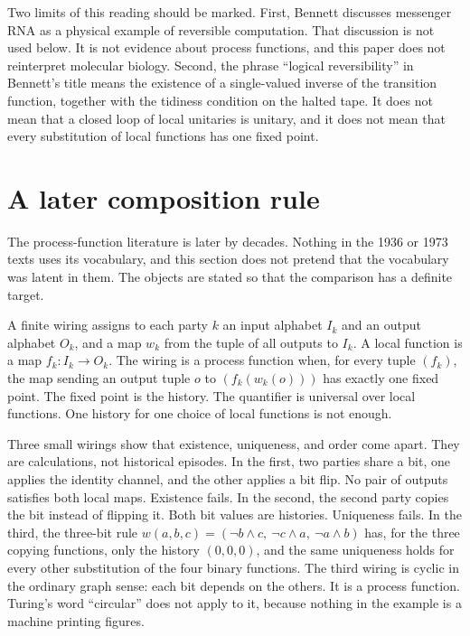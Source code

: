 \documentclass[12pt]{article}
\begin{document}
Two limits of this reading should be marked. First, Bennett discusses messenger RNA as a physical example of reversible computation. That discussion is not used below. It is not evidence about process functions, and this paper does not reinterpret molecular biology. Second, the phrase ``logical reversibility'' in Bennett's title means the existence of a single-valued inverse of the transition function, together with the tidiness condition on the halted tape. It does not mean that a closed loop of local unitaries is unitary, and it does not mean that every substitution of local functions has one fixed point.

\section{A later composition rule}
\label{sec:later}

The process-function literature is later by decades. Nothing in the 1936 or 1973 texts uses its vocabulary, and this section does not pretend that the vocabulary was latent in them. The objects are stated so that the comparison has a definite target.

A finite wiring assigns to each party $k$ an input alphabet $I_k$ and an output alphabet $O_k$, and a map $w_k$ from the tuple of all outputs to $I_k$. A local function is a map $f_k\colon I_k\to O_k$. The wiring is a process function when, for every tuple $(f_k)$, the map sending an output tuple $o$ to $(f_k(w_k(o)))$ has exactly one fixed point. The fixed point is the history. The quantifier is universal over local functions. One history for one choice of local functions is not enough.

Three small wirings show that existence, uniqueness, and order come apart. They are calculations, not historical episodes. In the first, two parties share a bit, one applies the identity channel, and the other applies a bit flip. No pair of outputs satisfies both local maps. Existence fails. In the second, the second party copies the bit instead of flipping it. Both bit values are histories. Uniqueness fails. In the third, the three-bit rule $w(a,b,c)=(\lnot b\land c,\ \lnot c\land a,\ \lnot a\land b)$ has, for the three copying functions, only the history $(0,0,0)$, and the same uniqueness holds for every other substitution of the four binary functions. The third wiring is cyclic in the ordinary graph sense: each bit depends on the others. It is a process function. Turing's word ``circular'' does not apply to it, because nothing in the example is a machine printing figures.
\end{document}
